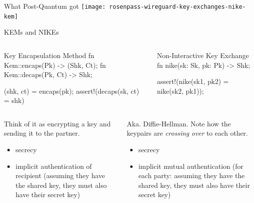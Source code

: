 \begin{frame}{What Post-Quantum got}
  \texttt{[image: rosenpass-wireguard-key-exchanges-nike-kem]}
\end{frame}

\begin{frame}[fragile,T,s]{KEMs and NIKEs}
\small
  \begin{columns}[t,fullwidth]
\hfill
\begin{column}{.47\linewidth}
\begin{rustblock}{Key Encapsulation Method}
fn Kem::encaps(Pk) -> (Shk, Ct);
fn Kem::decaps(Pk, Ct) -> Shk;

(shk, ct) = encaps(pk);
assert!(decaps(sk, ct) = shk)
\end{rustblock}
\end{column}
\hfill
\begin{column}{.47\linewidth}
\begin{rustblock}{Non-Interactive Key Exchange}
fn nike(sk: Sk, pk: Pk) -> Shk;

assert!(nike(sk1, pk2) =
        nike(sk2, pk1));
\end{rustblock}
\end{column}\hfill
\end{columns}
\begin{columns}[t,fullwidth]
\hfill
\begin{column}{.47\linewidth}
  Think of it as encrypting a key and sending it
        to the partner.

        \begin{itemize}
          \item secrecy
          \item implicit authentication of recipient
            (assuming they have the shared key, they must
            also have their secret key)
        \end{itemize}
\end{column}
\hfill
\begin{column}{.47\linewidth}
        Aka. Diffie-Hellman. Note how the
        keypairs are \emph{crossing over} to each other.

        \begin{itemize}
          \item secrecy
          \item implicit mutual authentication
            (for each party: assuming they have the shared key, they must
            also have their secret key)
        \end{itemize}
    \end{column}
    \hfill\strut
  \end{columns}
  \vfill
\end{frame}


